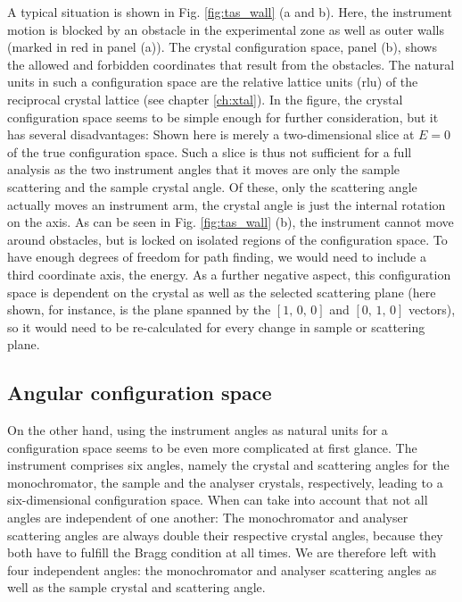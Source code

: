 A typical situation is shown in Fig. \ref{fig:tas_wall} (a and b). 
Here, the instrument motion is blocked by an obstacle in the experimental zone
as well as outer walls (marked in red in panel (a)).
The crystal configuration space, panel (b), shows the allowed and forbidden
coordinates that result from the obstacles. The natural units in such a
configuration space are the relative lattice units (rlu) of the reciprocal
crystal lattice (see chapter \ref{ch:xtal}).
In the figure, the crystal configuration space seems to be simple enough for 
further consideration, but it has several disadvantages: Shown here is merely
a two-dimensional slice at $E = 0$ of the true configuration space.
Such a slice is thus not sufficient for a full analysis as the two instrument
angles that it moves are only the sample scattering and the sample crystal angle.
Of these, only the scattering angle actually moves an instrument arm, the crystal
angle is just the internal rotation on the axis.
As can be seen in Fig. \ref{fig:tas_wall} (b), the instrument cannot move
around obstacles, but is locked on isolated regions of the configuration space.
To have enough degrees of freedom for path finding, we would need to include
a third coordinate axis, the energy.
As a further negative aspect, this configuration space is dependent on the 
crystal as well as the selected scattering plane (here shown, for instance, 
is the plane spanned by the $\left[1,\,0,\,0\right]$ and $\left[0,\,1,\,0\right]$ 
vectors), so it would need to be re-calculated for every change in sample or 
scattering plane.


\subsection{Angular configuration space}
On the other hand, using the instrument angles as natural units for a configuration
space seems to be even more complicated at first glance. 
The instrument comprises six angles, namely the crystal and 
scattering angles for the monochromator, the sample and the analyser crystals, 
respectively, leading to a six-dimensional configuration space. 
When can take into account that not all angles are independent of one another:
The monochromator and analyser scattering angles are always double their 
respective crystal angles, because they both have to fulfill the Bragg condition
at all times. 
We are therefore left with four independent angles: the monochromator and analyser
scattering angles as well as the sample crystal and scattering angle. 

